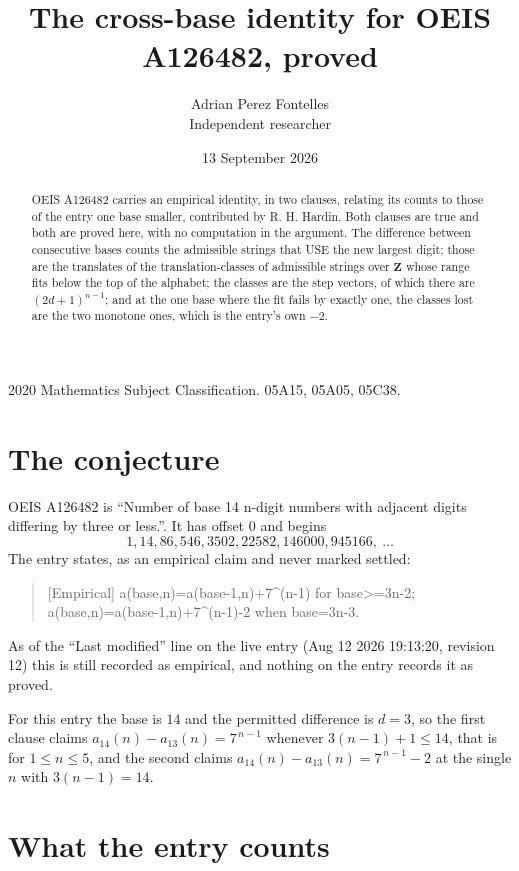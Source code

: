 \documentclass[11pt,a4paper]{article}
\title{The cross-base identity for OEIS A126482, proved}
\author{Adrian Perez Fontelles\\ \small Independent researcher}
\date{13 September 2026}
\theoremstyle{plain}
\theoremstyle{definition}
\begin{document}
\maketitle

\begin{abstract}
OEIS A126482 carries an empirical identity, in two clauses, relating its counts to those of the
entry one base smaller, contributed by R. H. Hardin. Both clauses are true and both are proved
here, with no computation in the argument. The difference between consecutive bases counts the
admissible strings that USE the new largest digit; those are the translates of the
translation-classes of admissible strings over $\mathbf{Z}$ whose range fits below the top of
the alphabet; the classes are the step vectors, of which there are $(2d+1)^{n-1}$; and at the
one base where the fit fails by exactly one, the classes lost are the two monotone ones, which
is the entry's own $-2$.
\end{abstract}

\noindent\small 2020 Mathematics Subject Classification. 05A15, 05A05, 05C38.\normalsize

\section{The conjecture}

OEIS A126482 is ``Number of base 14 n-digit numbers with adjacent digits differing by three or less.''. It has offset $0$ and begins
\[
1, 14, 86, 546, 3502, 22582, 146000, 945166,\ \dots
\]
The entry states, as an empirical claim and never marked settled:
\begin{quote}
[Empirical] a(base,n)=a(base-1,n)+7\textasciicircum{}(n-1) for base>=3n-2; a(base,n)=a(base-1,n)+7\textasciicircum{}(n-1)-2 when base=3n-3.
\end{quote}
As of the ``Last modified'' line on the live entry (Aug 12 2026 19:13:20, revision 12)
this is still recorded as empirical, and nothing on the entry records it as proved.

For this entry the base is $14$ and the permitted difference is $d=3$, so the first clause
claims $a_{14}(n)-a_{13}(n)=7^{\,n-1}$ whenever $3(n-1)+1\le14$, that is for
$1\le n\le5$, and the second claims $a_{14}(n)-a_{13}(n)=7^{\,n-1}-2$ at the single
$n$ with $3(n-1)=14$.

\section{What the entry counts}
\end{document}
